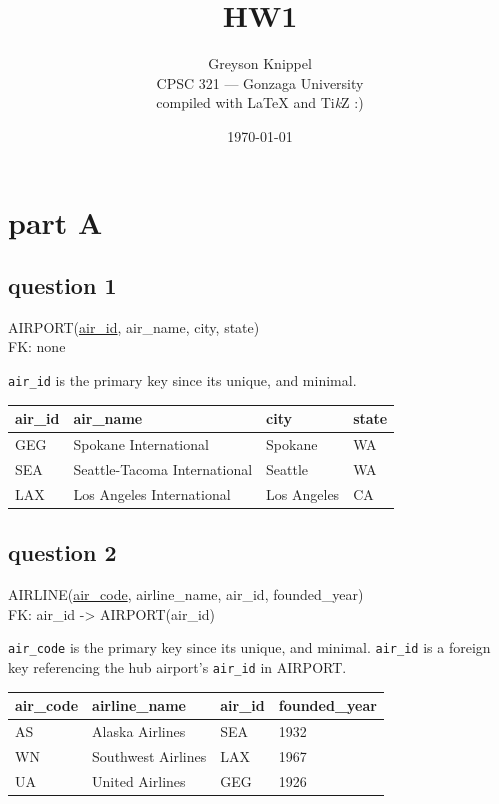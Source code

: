 \documentclass[12pt]{article}
\title{HW1}
\author{
Greyson Knippel \\[4pt]
CPSC 321 --- Gonzaga University \\[4pt]
compiled with \LaTeX{} and Ti\emph{k}Z :)
}
\date{\today}
\newcommand{\schema}[1]{%
  \begin{center}%
  \setlength{\fboxsep}{8pt}%
  \colorbox{gray!10}{%
    \begin{minipage}{0.93\linewidth}\ttfamily\small\raggedright #1\end{minipage}}%
  \end{center}%
}
\begin{document}
\maketitle

\section*{part A}

\subsection*{question 1}

\schema{
AIRPORT(\underline{air\_id}, air\_name, city, state)\\[4pt]
FK: none
}

\texttt{air\_id} is the primary key since its unique, and minimal.

\begin{table}[H]
\centering
\begin{tabular}{|l|l|l|l|}
\hline
\textbf{air\_id} & \textbf{air\_name} & \textbf{city} & \textbf{state} \\
\hline
GEG & Spokane International & Spokane & WA \\
SEA & Seattle-Tacoma International & Seattle & WA \\
LAX & Los Angeles International & Los Angeles & CA \\
\hline
\end{tabular}
\end{table}

\subsection*{question 2}

\schema{
AIRLINE(\underline{air\_code}, airline\_name, air\_id, founded\_year)\\[4pt]
FK: air\_id -> AIRPORT(air\_id)
}

\texttt{air\_code} is the primary key since its unique, and minimal.
\texttt{air\_id} is a foreign key referencing the hub airport's \texttt{air\_id}
in AIRPORT.

\begin{table}[H]
\centering
\begin{tabular}{|l|l|l|l|}
\hline
\textbf{air\_code} & \textbf{airline\_name} & \textbf{air\_id} & \textbf{founded\_year} \\
\hline
AS & Alaska Airlines & SEA & 1932 \\
WN & Southwest Airlines & LAX & 1967 \\
UA & United Airlines & GEG & 1926 \\
\hline
\end{tabular}
\end{table}
\end{document}
